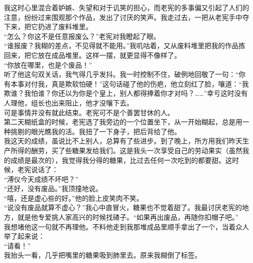 我这时心里混合着妒嫉、失望和对于讥笑的担心，而老宪的多事偏又引起了人们的注意，纷纷过来围观那个作品，发出了讨厌的笑声。我走过去，一把从老宪手中夺下来，把它扔进了废料堆里。\\

“怎么？你这不是任意报废么？”老宪对我瞪起了眼。\\

“谁报废？我糊的差点，不见得就不能用。”我叽咕着，又从废料堆里把我的作品拣回来，把它放在成品堆里。这样一摆，就更显得不像样了。\\

“你放在哪里，也是个废品！”\\

听了他这句双关话，我气得几乎发抖。我一时控制不住，破例地回敬了一句：“你有本事对付我，真是欺软怕硬！”这句话碰了他的伤疤，他立刻红了脸，嚷道：“我欺谁？我怕谁？你还以为你是个皇上，别人都得捧着你才对吗？……”幸亏这时没有人理他，组长也出来阻止，他才没嚷下去。\\

可是事情并没有就此结束。老宪可不是个善罢甘休的人。\\

第二天糊纸盒的时候，老宪选了我旁边的一个位置坐下，从一开始糊起，总是用一种挑剔的眼光瞧我的活。我扭了一下身子，把后背给了他。\\

我这天的成绩，虽说比不上别人，总算有了些进步。到了晚上，所方用我们昨天生产所得的酬劳，买了些糖果发给我们。这是我头一次享受自己的劳动果实（虽然我的成绩是最次的），我觉得我分得的糖果，比过去任何一次吃到的都要甜。这时候，老宪说话了：\\

“溥仪今天成绩不坏吧？”\\

“还好，没有废品。”我顶撞地说。\\

“嘻，还是虚心些的好。”他的脸上皮笑肉不笑。\\

“说没有废品就算不虚心？”我心中直冒火，糖果也不觉着甜了。我最讨厌老宪的地方，就是他专爱挑人家高兴的时候找碴子。“如果再出废品，再随你扣帽子吧。”\\

我想堵他这一句就不再理他。不料他走到我那堆成品里顺手拿出了一个，当着众人举了起来说：\\

“请看！”\\

我抬头一看，几乎把嘴里的糖果吸到肺里去。原来我糊倒了标签。\\

